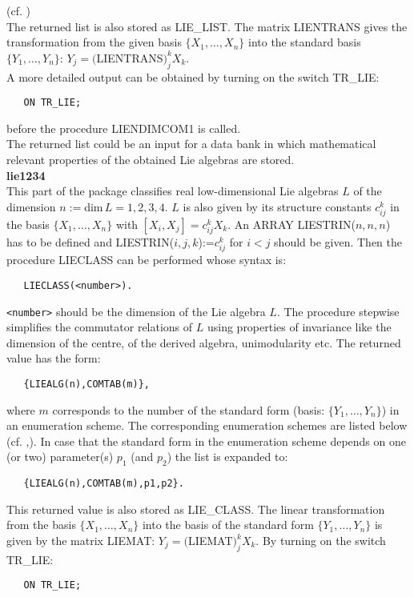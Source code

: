 (cf. \cite{cssmp92})\\[0.2cm]
The returned list is also stored as LIE\_LIST. The matrix LIENTRANS gives the
transformation from the given basis $\{X_1,\ldots ,X_n\}$ into the standard
basis $\{Y_1,\ldots ,Y_n\}$: $Y_j=($LIENTRANS$)_j^k X_k$.\\[0.1cm]
A more detailed output can be obtained by turning on the switch TR\_LIE:
\begin{verbatim}
   ON TR_LIE;
\end{verbatim}
before the procedure LIENDIMCOM1 is called.\\[0.1cm]
The returned list could be an input for a data bank in which mathematical
relevant properties of the obtained Lie algebras are stored.\\[0.3cm]
{\large\bf lie1234}\\[0.1cm]
This part of the package classifies real low-dimensional Lie algebras $L$
of the dimension
$n:=$dim$\,L=1,2,3,4$. $L$ is also given by its structure constants $c_{ij}^k$
in the basis $\{X_1,\ldots,X_n\}$ with $[X_i,X_j]=c_{ij}^k X_k$. An ARRAY
LIESTRIN($n,n,n$) has to be defined and LIESTRIN($i,j,k$):=$c_{ij}^k$ for
$i<j$ should be given. Then the procedure LIECLASS can be performed
whose syntax is:
\begin{verbatim}
   LIECLASS(<number>).
\end{verbatim}
{\tt <number>} should be the dimension of the Lie algebra $L$. The procedure
stepwise simplifies the commutator relations of $L$ using properties of
invariance like the dimension of the centre, of the derived algebra,
unimodularity etc.  The returned value has the form:
\begin{verbatim}
   {LIEALG(n),COMTAB(m)},
\end{verbatim}
where $m$ corresponds to the number of the standard form (basis:
$\{Y_1,\ldots,Y_n\}$) in an enumeration scheme. The corresponding enumeration
schemes are listed below (cf. \cite{ntz-preprint27/92},\cite{mmpreprint1979}).
In case that the standard form in the enumeration scheme depends on one (or two)
parameter(s) $p_1$ (and $p_2$) the list is expanded to:
\begin{verbatim}
   {LIEALG(n),COMTAB(m),p1,p2}.
\end{verbatim}
This returned value is also stored as LIE\_CLASS. The linear transformation from
the basis $\{X_1,\ldots,X_n\}$ into the basis of the standard form
$\{Y_1,\ldots,Y_n\}$ is given by the matrix LIEMAT:
$Y_j=($LIEMAT$)_j^k X_k$.\newpage
By turning on the switch TR\_LIE:
\begin{verbatim}
   ON TR_LIE;
\end{verbatim}
